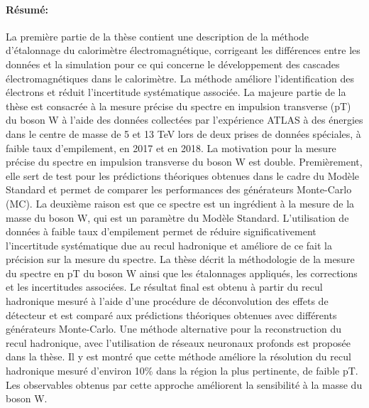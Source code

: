 \begin{mdframed}[linecolor=Prune,linewidth=1]
\begin{small}
\begin{multicols}{2}
\paragraph*{Résumé:} La première partie de la thèse contient une description de la méthode d'étalonnage du calorimètre électromagnétique, corrigeant les différences entre les données et la simulation pour ce qui concerne le développement des cascades électromagnétiques dans le calorimètre. La méthode améliore l'identification des électrons et réduit l'incertitude systématique associée.
La majeure partie de la thèse est consacrée à la mesure précise du spectre en impulsion transverse (pT) du boson W à l'aide des données collectées par l'expérience ATLAS à des énergies dans le centre de masse de 5 et 13 TeV lors de deux prises de données spéciales, à faible taux d’empilement, en 2017 et en 2018.
La motivation pour la mesure précise du spectre en impulsion transverse du boson W est double. Premièrement, elle sert de test pour les prédictions théoriques obtenues dans le cadre du Modèle Standard et permet de comparer les performances des générateurs Monte-Carlo (MC). La deuxième raison est que ce spectre est un ingrédient à la mesure de la masse du boson W, qui est un paramètre du Modèle Standard. L'utilisation de données à faible taux d'empilement permet de réduire significativement l'incertitude systématique due au recul hadronique et améliore de ce fait la précision sur la mesure du spectre.
La thèse décrit la méthodologie de la mesure du spectre en pT du boson W ainsi que les étalonnages appliqués, les corrections et les incertitudes associées. Le résultat final est obtenu à partir du recul hadronique mesuré à l'aide d'une procédure de déconvolution des effets de détecteur et est comparé aux prédictions théoriques obtenues avec différents générateurs Monte-Carlo.
Une méthode alternative pour la reconstruction du recul hadronique, avec l'utilisation de réseaux neuronaux profonds est proposée dans la thèse. Il y est montré que cette méthode améliore la résolution du recul hadronique mesuré d'environ 10\% dans la région la plus pertinente, de faible pT. Les observables obtenus par cette approche améliorent la sensibilité à la masse du boson W.
\end{multicols}
\end{small}
\end{mdframed}


